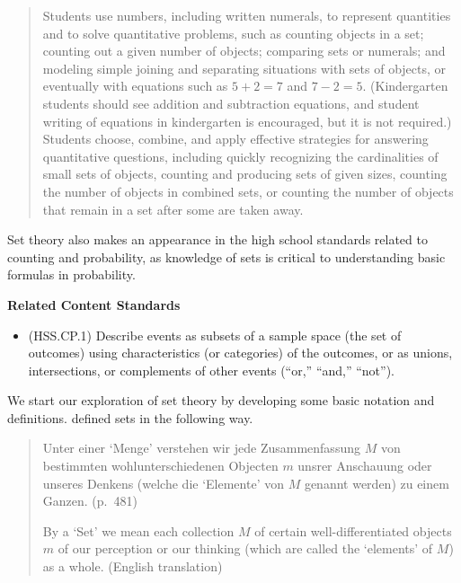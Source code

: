 \documentclass[
]{book}
\providecommand{\tightlist}{%
  \setlength{\itemsep}{0pt}\setlength{\parskip}{0pt}}
\newenvironment{standards}{}{}
\theoremstyle{definition}
\theoremstyle{definition}
\theoremstyle{definition}
\theoremstyle{definition}
\theoremstyle{remark}
\begin{document}
\begin{quote}
Students use numbers, including written numerals, to represent quantities and to solve quantitative problems, such as counting objects in a set; counting out a given number of objects; comparing sets or numerals; and modeling simple joining and separating situations with sets of objects, or eventually with equations such as \(5 + 2 = 7\) and \(7 - 2 = 5\). (Kindergarten students should see addition and subtraction equations, and student writing of equations in kindergarten is encouraged, but it is not required.) Students choose, combine, and apply effective strategies for answering quantitative questions, including quickly recognizing the cardinalities of small sets of objects, counting and producing sets of given sizes, counting the number of objects in combined sets, or counting the number of objects that remain in a set after some are taken away. \citep{CCSS}
\end{quote}

Set theory also makes an appearance in the high school standards related to counting and probability, as knowledge of sets is critical to understanding basic formulas in probability.

\begin{standards}

\begin{center}
\textbf{Related Content Standards}

\end{center}

\begin{itemize}
\tightlist
\item
  (HSS.CP.1) Describe events as subsets of a sample space (the set of outcomes) using characteristics (or categories) of the outcomes, or as unions, intersections, or complements of other events (``or,'' ``and,'' ``not'').
\end{itemize}

\end{standards}

We start our exploration of set theory by developing some basic notation and definitions. \citet{Cantor} defined sets in the following way.

\begin{quote}
Unter einer `Menge' verstehen wir jede Zusammenfassung \(M\) von bestimmten wohlunterschiedenen Objecten \(m\) unsrer Anschauung oder unseres Denkens (welche die `Elemente' von \(M\) genannt werden) zu einem Ganzen. (p.~481)

By a `Set' we mean each collection \(M\) of certain well-differentiated objects \(m\) of our perception or our thinking (which are called the `elements' of \(M\)) as a whole. (English translation)
\end{quote}
\end{document}

